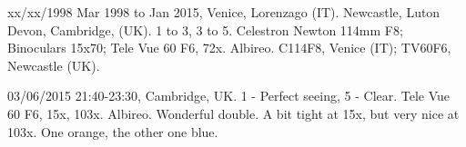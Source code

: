 \item xx/xx/1998 Mar 1998 to Jan 2015, Venice, Lorenzago (IT). Newcastle, Luton Devon, Cambridge, (UK). 1 to 3, 3 to 5. Celestron Newton 114mm F8; Binoculars 15x70; Tele Vue 60 F6, 72x. Albireo. C114F8, Venice (IT); TV60F6, Newcastle (UK).
\item 03/06/2015 21:40-23:30, Cambridge, UK. 1 - Perfect seeing, 5 - Clear. Tele Vue 60 F6, 15x, 103x. Albireo. Wonderful double. A bit tight at 15x, but very nice at 103x. One orange, the other one blue.
